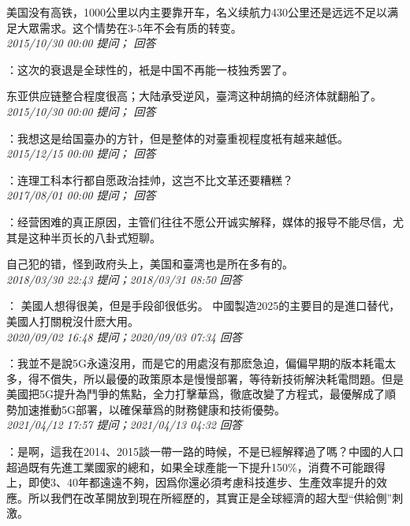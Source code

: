 \documentclass[twocolumn]{ctexart}
\begin{document}
美国没有高铁，1000公里以内主要靠开车，名义续航力430公里还是远远不足以满足大眾需求。这个情势在3-5年不会有质的转变。\\

\textit{\hfill\noindent\small 2015/10/30 00:00 提问； 回答}

：这次的衰退是全球性的，衹是中国不再能一枝独秀罢了。

东亚供应链整合程度很高；大陆承受逆风，臺湾这种胡搞的经济体就翻船了。\\

\textit{\hfill\noindent\small 2015/10/30 00:00 提问； 回答}

：我想这是给国臺办的方针，但是整体的对臺重视程度衹有越来越低。\\

\textit{\hfill\noindent\small 2015/12/15 00:00 提问； 回答}

：连理工科本行都自愿政治挂帅，这岂不比文革还要糟糕？\\

\textit{\hfill\noindent\small 2017/08/01 00:00 提问； 回答}

：经营困难的真正原因，主管们往往不愿公开诚实解释，媒体的报导不能尽信，尤其是这种半页长的八卦式短聊。

自己犯的错，怪到政府头上，美国和臺湾也是所在多有的。\\

\textit{\hfill\noindent\small 2018/03/30 22:43 提问；2018/03/31 08:50 回答}

：
美國人想得很美，但是手段卻很低劣。
中國製造2025的主要目的是進口替代，美國人打關稅沒什麽大用。
\\

\textit{\hfill\noindent\small 2020/09/02 16:48 提问；2020/09/03 07:34 回答}

：我並不是說5G永遠沒用，而是它的用處沒有那麽急迫，偏偏早期的版本耗電太多，得不償失，所以最優的政策原本是慢慢部署，等待新技術解決耗電問題。但是美國把5G提升為鬥爭的焦點，全力打擊華爲，徹底改變了方程式，最優解成了順勢加速推動5G部署，以確保華爲的財務健康和技術優勢。
\\

\textit{\hfill\noindent\small 2021/04/12 17:57 提问；2021/04/13 04:32 回答}

：是啊，這我在2014、2015談一帶一路的時候，不是已經解釋過了嗎？中國的人口超過既有先進工業國家的總和，如果全球產能一下提升150\%，消費不可能跟得上，即使3、40年都遠遠不夠，因爲你還必須考慮科技進步、生產效率提升的效應。所以我們在改革開放到現在所經歷的，其實正是全球經濟的超大型“供給側”刺激。
\end{document}

